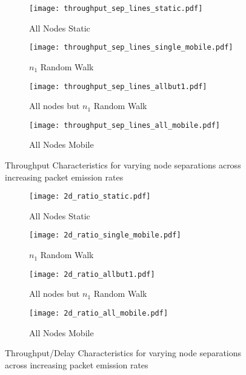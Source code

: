 \documentclass[runningheads,a4paper]{llncs}
\begin{document}
\begin{figure}
\begin{subfigure}{.5\textwidth}
  \centering
  \texttt{[image: throughput\_sep\_lines\_static.pdf]}
  \caption{All Nodes Static}
  \label{fig:throughput_static}
\end{subfigure}%
\begin{subfigure}{.5\textwidth}
  \centering
  \texttt{[image: throughput\_sep\_lines\_single\_mobile.pdf]}
  \caption{$n_1$ Random Walk}
  \label{fig:throughput_single_mobile}
\end{subfigure}
\begin{subfigure}{.5\textwidth}
\centering
  \texttt{[image: throughput\_sep\_lines\_allbut1.pdf]}
  \caption{All nodes but $n_1$ Random Walk}
  \label{fig:throughput_allbut1}
\end{subfigure}
\begin{subfigure}{.5\textwidth}
\centering
  \texttt{[image: throughput\_sep\_lines\_all\_mobile.pdf]}
  \caption{All Nodes Mobile}
  \label{fig:throughput_all_mobile}
\end{subfigure}
\caption{Throughput Characteristics for varying node separations across increasing packet emission rates}
\label{fig:scenario_throughputs_plain}
\end{figure}

\begin{figure}
\begin{subfigure}{.5\textwidth}
    \centering
  \texttt{[image: 2d\_ratio\_static.pdf]}
  \caption{All Nodes Static}
  \label{fig:2d_throughput_static}
\end{subfigure}%
\begin{subfigure}{.5\textwidth}
  \centering
  \texttt{[image: 2d\_ratio\_single\_mobile.pdf]}
  \caption{$n_1$ Random Walk}
  \label{fig:2d_throughput_single_mobile}
\end{subfigure}
\begin{subfigure}{.5\textwidth}
\centering
  \texttt{[image: 2d\_ratio\_allbut1.pdf]}
  \caption{All nodes but $n_1$ Random Walk}
  \label{fig:2d_throughput_allbut1}
\end{subfigure}
\begin{subfigure}{.5\textwidth}
\centering
  \texttt{[image: 2d\_ratio\_all\_mobile.pdf]}
  \caption{All Nodes Mobile}
  \label{fig:2d_throughput_all_mobile}
\end{subfigure}
\caption{Throughput/Delay Characteristics for varying node separations across increasing packet emission rates}
\label{fig:scenario_throughputratios_2d}
\end{figure}
\end{document}

